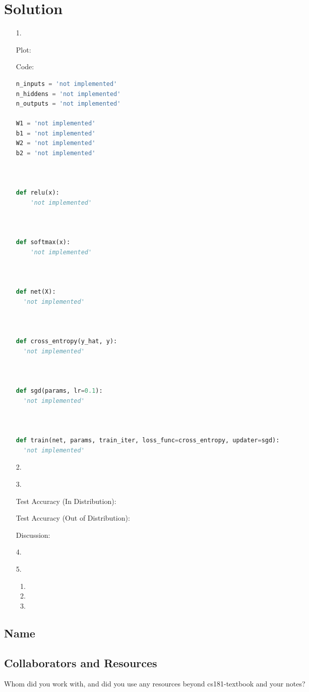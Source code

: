 \documentclass[submit]{harvardml}
\newenvironment{answer}
  {\section*{Solution}}
{}
\begin{document}
\begin{answer}

  \begin{enumerate}
    \item[1.]

      Plot:


      Code:

      \begin{lstlisting}[language=Python]
n_inputs = 'not implemented'
n_hiddens = 'not implemented'
n_outputs = 'not implemented'

W1 = 'not implemented'
b1 = 'not implemented'
W2 = 'not implemented'
b2 = 'not implemented'



def relu(x):
    'not implemented'



def softmax(x):
    'not implemented'



def net(X):
  'not implemented'



def cross_entropy(y_hat, y):
  'not implemented'



def sgd(params, lr=0.1):
  'not implemented'



def train(net, params, train_iter, loss_func=cross_entropy, updater=sgd):
  'not implemented'

\end{lstlisting}

    \item[2.]

    \item[3.]

      Test Accuracy (In Distribution):

      Test Accuracy (Out of Distribution):

      Discussion:

    \item[4.]

    \item[5.]

      \begin{enumerate}
        \item
        \item
        \item
      \end{enumerate}


  \end{enumerate}

\end{answer}


\newpage
\subsection*{Name}

\subsection*{Collaborators and Resources}
Whom did you work with, and did you use any resources beyond cs181-textbook and your notes?
\end{document}
